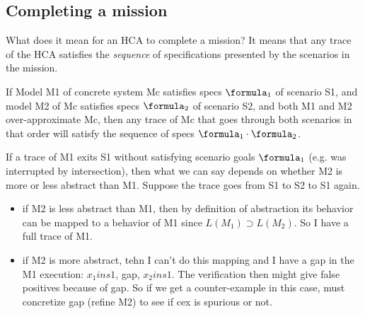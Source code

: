 \subsection{Completing a mission}
\label{missionSatisfaction}
What does it mean for an HCA to complete a mission?
It means that any trace of the HCA satisfies the \emph{sequence} of specifications presented by the scenarios in the mission.

\begin{thm}
	If Model M1 of concrete system Mc satisfies specs $\formula_1$ of scenario S1, and model M2 of Mc satisfies specs $\formula_2$ of scenario S2, and both M1 and M2 over-approximate Mc, 
	then any trace of Mc that goes through both scenarios in that order will satisfy the sequence of specs $\formula_1 \cdot \formula_2$.
	
	If a trace of M1 exits S1 without satisfying scenario goals $\formula_1$ (e.g. was interrupted by intersection), then what we can say depends on whether M2 is more or less abstract than M1.
	Suppose the trace goes from S1 to S2 to S1 again.
	\begin{itemize}
		\item if M2 is less abstract than M1, then by definition of abstraction its behavior can be mapped to a behavior of M1 since $L(M_1) \supset L(M_2)$. So I have a full trace of M1.
		\item if M2 is more abstract, tehn I can't do this mapping and I have a gap in the M1 execution: $x_1 in s1$, gap, $x_2 in s1$. 
		The verification then might give false positives because of gap.
		So if we get a counter-example in this case, must concretize gap  (refine M2) to see if cex is spurious or not.
	\end{itemize}
\end{thm}
